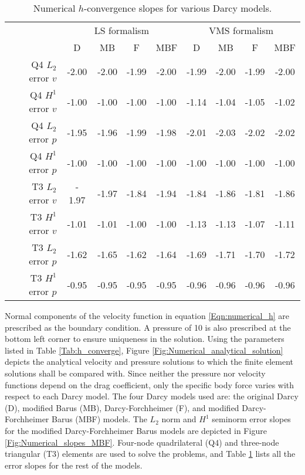 \documentclass[11pt,reqno]{amsart}
\begin{document}
\begin{table}[h!]
  \centering
  \caption{Numerical $h$-convergence slopes for various Darcy models.}
  \begin{tabular}{rcccc|cccc}
      \hline
      $\;$ & \multicolumn{4}{c|}{LS formalism} & \multicolumn{4}{c}{VMS formalism} \\
      $\;$ & D & MB & F & MBF & D & MB & F & MBF \\
      \hline
      Q4 $L_2$ error $v$ & -2.00 & -2.00 & -1.99 & -2.00 & -1.99 & -2.00 & -1.99 & -2.00 \\
      Q4 $H^1$ error $v$ & -1.00 & -1.00 & -1.00 & -1.00 & -1.14 & -1.04 & -1.05 & -1.02 \\
      Q4 $L_2$ error $p$ & -1.95 & -1.96 & -1.99 & -1.98 & -2.01 & -2.03 & -2.02 & -2.02 \\
      Q4 $H^1$ error $p$ & -1.00 & -1.00 & -1.00 & -1.00 & -1.00 & -1.00 & -1.00 & -1.00 \\
      \hline
      T3 $L_2$ error $v$ & - 1.97 & -1.97 & -1.84 & -1.94 & -1.84 & -1.86 & -1.81 & -1.86 \\
      T3 $H^1$ error $v$ & -1.01 & -1.01 & -1.00 & -1.00 & -1.13 & -1.13 & -1.07 & -1.11 \\
      T3 $L_2$ error $p$ & -1.62 &  -1.65 & -1.62 & -1.64 & -1.69 & -1.71 & -1.70 & -1.72 \\
      T3 $H^1$ error $p$ & -0.95 & -0.95 & -0.95 & -0.95 & -0.96 & -0.96 & -0.96 & -0.96 \\
      \hline
  \end{tabular}
  \label{Tab:h_convergence_table}
\end{table}
Normal components of the velocity function in equation \eqref{Eqn:numerical_h} 
are prescribed as the boundary condition. A pressure of 10 is also prescribed
at the bottom left corner to ensure uniqueness in the solution.
Using the parameters listed in Table \ref{Tab:h_converge}, 
Figure \ref{Fig:Numerical_analytical_solution} depicts the analytical velocity 
and pressure solutions to which the finite element solutions shall be compared 
with. Since neither the pressure nor velocity functions depend on the drag 
coefficient, only the specific body force varies with respect to each Darcy model.
The four Darcy models used are: the original Darcy (D), modified Barus (MB), 
Darcy-Forchheimer (F), and modified Darcy-Forchheimer Barus (MBF) models. 
The $L_2$ norm and $H^1$ seminorm error slopes for the modified Darcy-Forchheimer 
Barus models are depicted in Figure \ref{Fig:Numerical_slopes_MBF}. Four-node 
quadrilateral (Q4) and three-node triangular (T3) elements are used to solve 
the problems, and Table \ref{Tab:h_convergence_table} 
lists all the error slopes for the rest of the models.
\end{document}
